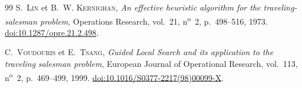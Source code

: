 \documentclass[11pt,a4paper]{article}
\begin{document}
\begin{thebibliography}{99}
S.~\textsc{Lin} et B.~W. \textsc{Kernighan},
\textit{An effective heuristic algorithm for the traveling-salesman problem},
Operations Research, vol.~21, n\textsuperscript{o}~2, p.~498--516, 1973.
\href{https://doi.org/10.1287/opre.21.2.498}{doi:10.1287/opre.21.2.498}.

C.~\textsc{Voudouris} et E.~\textsc{Tsang},
\textit{Guided Local Search and its application to the traveling salesman problem},
European Journal of Operational Research, vol.~113, n\textsuperscript{o}~2, p.~469--499, 1999.
\href{https://doi.org/10.1016/S0377-2217(98)00099-X}{doi:10.1016/S0377-2217(98)00099-X}.

\end{thebibliography}
\end{document}
